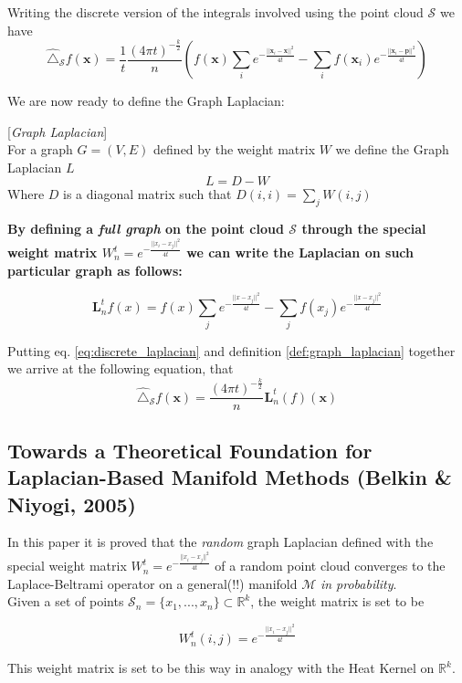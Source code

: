Writing the discrete version of the integrals involved using the point cloud $\mathcal S$ we have
\begin{equation}\label{eq:discrete_laplacian}
	\hat \triangle_\mathcal S f(\mathbf x) =  \frac{1}{t} \frac{(4\pi t)^{-\frac{k}{2}}}{n}\left( f(\mathbf x)\sum_{i} e^{-\frac{||\mathbf x_i - \mathbf x||^2}{4t}} - \sum_{i} f(\mathbf x_i) e^{-\frac{||\mathbf x_i - \mathbf p||^2}{4t}}\right)
\end{equation}

We are now ready to define the Graph Laplacian:
\begin{definition}{[\textit{Graph Laplacian}]}\\
	For a graph $G = (V, E)$ defined by the weight matrix $W$ we define the Graph Laplacian $L$
	$$L = D-W$$
	Where $D$ is a diagonal matrix such that $D(i,i) = \sum_j W(i,j)$	
	\label{def:graph_laplacian}
\end{definition}
\textbf{By defining a \textit{full graph} on the point cloud $\mathcal S$ through the special weight matrix $W_n^t  = e^{-\frac{||x_i-x_j||^2}{4t}}$ we can write the Laplacian on such particular graph as follows:}
	
$$\mathbf L_n^tf(x) = f(x)\sum_{j}e^{-\frac{||x-x_j||^2}{4t}} - \sum_jf(x_j)e^{-\frac{||x-x_j||^2}{4t}}$$
	
Putting eq. \ref{eq:discrete_laplacian} and definition \ref{def:graph_laplacian} together we arrive at the following equation, that 
$$\hat \triangle_\mathcal S f(\mathbf x) =  \frac{(4\pi t)^{-\frac{k}{2}}}{n} \mathbf L_n^t(f)(\mathbf x)$$



\subsection{Towards a Theoretical Foundation for Laplacian-Based Manifold Methods (Belkin \& Niyogi, 2005)}
In this paper it is proved that the \textit{random} graph Laplacian defined with the special weight matrix $W_n^t  = e^{-\frac{||x_i-x_j||^2}{4t}}$ of a random point cloud converges to the Laplace-Beltrami operator on a general(!!) manifold $\mathcal M$ \textit{in probability}.\\

Given a set of points $\mathcal S_n = \{x_1, ..., x_n\} \subset \mathbb R^k$, the weight matrix is set to be 

$$W_n^t(i,j) = e^{-\frac{||x_i-x_j||^2}{4t}}$$

This weight matrix is set to be this way in analogy with the Heat Kernel on $\mathbb R^k$.\\


